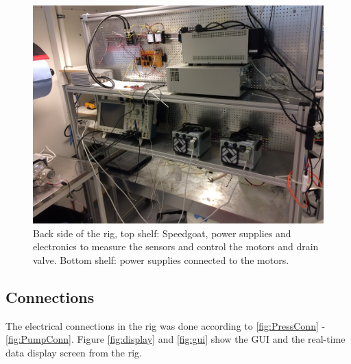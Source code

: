 \begin{figure}[H]
    \centering
    \includegraphics[width=1\textwidth]{back}
    \caption{Back side of the rig, top shelf: Speedgoat, power supplies and electronics to measure the sensors and control the motors and drain valve. Bottom shelf: power supplies connected to the motors.}
    \label{fig:back}
\end{figure}

\subsection{Connections}
The electrical connections in the rig was done according to \ref{fig:PressConn} - \ref{fig:PumpConn}. Figure \ref{fig:display} and \ref{fig:gui} show the GUI and the real-time data display screen from the rig.  

